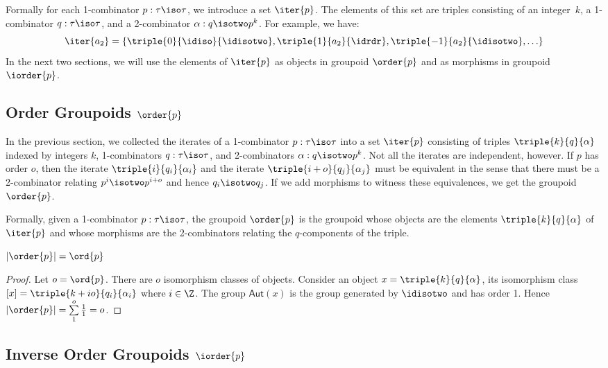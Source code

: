 Formally for each 1-combinator $p : \tau\iso\tau$, we introduce a set
$\iter{p}$. The elements of this set are triples consisting of an
integer~$k$, a 1-combinator $q : \tau\iso\tau$, and a 2-combinator
$\alpha : q \isotwo p^k$. For example, we have:
\[
\iter{a_2} = \{ \triple{0}{\idiso}{\idisotwo}, \triple{1}{a_2}{\idrdr},
\triple{-1}{a_2}{\idisotwo}, \ldots \}
\]
In the next two sections, we will use the elements of $\iter{p}$ as
objects in groupoid $\order{p}$ and as morphisms in groupoid
$\iorder{p}$.

\subsection{Order Groupoids $\order{p}$}
   
In the previous section, we collected the iterates of a 1-combinator
$p : \tau\iso\tau$ into a set $\iter{p}$ consisting of triples
$\triple{k}{q}{\alpha}$ indexed by integers $k$, 1-combinators
$q : \tau\iso\tau$, and 2-combinators $\alpha : q \isotwo p^k$. Not
all the iterates are independent, however. If $p$ has order $o$, then
the iterate $\triple{i}{q_i}{\alpha_i}$ and the iterate
$\triple{i+o}{q_j}{\alpha_j}$ must be equivalent in the sense that
there must be a 2-combinator relating $p^i \isotwo p^{i+o}$ and hence
$q_i \isotwo q_j$. If we add morphisms to witness these equivalences,
we get the groupoid $\order{p}$.

Formally, given a 1-combinator $p : \tau\iso\tau$, the groupoid
$\order{p}$ is the groupoid whose objects are the elements
$\triple{k}{q}{\alpha}$ of $\iter{p}$ and whose morphisms are the
2-combinators relating the $q$-components of the triple.

\begin{lemma}
  $|\order{p}| = \ord{p}$
\end{lemma}
\begin{proof}
  Let $o = \ord{p}$. There are $o$ isomorphism classes of
  objects. Consider an object $x = \triple{k}{q}{\alpha}$, its
  isomorphism class $[x] = \triple{k+io}{q_i}{\alpha_i}$ where
  $i \in \Z$. The group $\textsf{Aut}(x)$ is the group generated by
  $\idisotwo$ and has order 1. Hence
  $|\order{p}| = \sum\limits_{1}^{o}\frac{1}{1} = o$.
\end{proof}

\subsection{Inverse Order Groupoids $\iorder{p}$}
  
